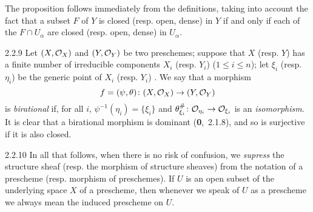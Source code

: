 The proposition follows immediately from the definitions, taking into
account the fact that a subset $F$ of $Y$ is closed (resp. open, dense) in $Y$
if and only if each of the $F\cap U_\alpha$ are closed (resp. open, dense) in
$U_\alpha$.

\begin{env}{2.2.9}
\label{env-1.2.2.9}
Let $(X,\mathcal{O}_X)$ and $(Y,\mathcal{O}_Y)$ be two preschemes; suppose that
$X$ (resp. $Y$) has a finite number of irreducible components $X_i$ (resp.
$Y_i$) ($1\leqslant i\leqslant n$); let $\xi_i$ (resp. $\eta_i$) be the generic
point of $X_i$ (resp. $Y_i$) . We say that a morphism
\[
  f=(\psi,\theta)\colon(X,\mathcal{O}_X)\to(Y,\mathcal{O}_Y)
\]
is \emph{birational}
if, for all $i$, $\psi^{-1}(\eta_i)=\{\xi_i\}$ and
$\theta_{\xi_i}^\#\colon\mathcal{O}_{\eta_i}\to\mathcal{O}_{\xi_i}$ is an \emph{isomorphism}. It
is clear that a birational morphism is dominant (\textbf{0},~2.1.8), and so is
surjective if it is also closed.
\end{env}

\begin{envr}{2.2.10}
\label{rmk-1.2.2.10}
In all that follows, when there is
no risk of confusion, we \emph{supress} the structure sheaf (resp. the morphism
of structure sheaves) from the notation of a prescheme (resp. morphism of
preschemes). If $U$ is an open subset of the underlying space $X$ of a
prescheme, then whenever we speak of $U$ as a prescheme we always mean the
induced prescheme on $U$.
\end{envr}

